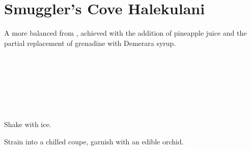 \section[SC Halekulani]{
    Smuggler's Cove Halekulani
}

\begin{recipestats}[
        servings=1,
        preptime=5~\minute,
        original=\citefield{sippinSafari}{shorttitle} \cite{sippinSafari},
        source=\citefield{smugglersCove}{shorttitle} \cite{smugglersCove}
    ]
\end{recipestats}

\begin{recipeabstract}
    A more balanced  from \citeauthor{smugglersCove},
    achieved with the addition of pineapple juice and the partial replacement
    of grenadine with Demerara syrup.
\end{recipeabstract}

\begin{ingredientcolumns}
    \begin{ingredientblock}
        \\
        \\
        \\
    \end{ingredientblock}
    \begin{ingredientblock}
        \\
        \\
    \end{ingredientblock}
\end{ingredientcolumns}

\begin{preparation}
\item Shake with ice.
\item Strain into a chilled coupe, garnish with an edible orchid.
\end{preparation}

\recipeend
